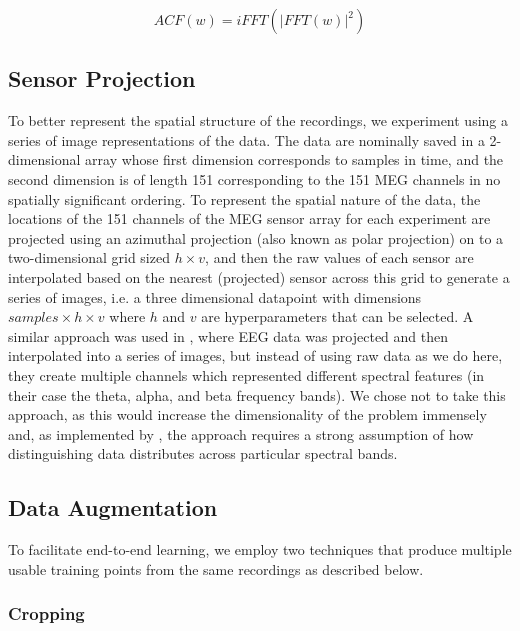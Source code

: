 \documentclass[utf8]{frontiersSCNS} %
\begin{document}

\begin{equation}
  ACF(w) = iFFT(|FFT(w)|^2)
  \label{eq1}
\end{equation}

\subsection{Sensor Projection}\label{sec:sens_proj}

To better represent the spatial structure of the recordings, we experiment using a series of image representations of the data. The data are nominally saved in a 2-dimensional array whose first dimension corresponds to samples in time, and the second dimension is of length 151 corresponding to the 151 MEG channels in no spatially significant ordering. To represent the spatial nature of the data, the locations of the 151 channels of the MEG sensor array for each experiment are projected using an azimuthal projection (also known as polar projection) on to a two-dimensional grid sized $h \times v$, and then the raw values of each sensor are  interpolated based on the nearest (projected) sensor across this grid to generate a series of images, i.e. a three dimensional datapoint with dimensions $samples \times  h \times v$ where $h$ and $v$ are hyperparameters that can be selected. A similar approach was used in \cite{Bashivan2016}, where EEG data was projected and then interpolated into a series of images, but instead of using raw data as we do here, they create multiple channels which represented different spectral features (in their case the theta, alpha, and beta frequency bands). We chose not to take this approach, as this would increase the dimensionality of the problem immensely and, as implemented by \cite{Bashivan2016}, the approach requires a strong assumption of how distinguishing data distributes across particular spectral bands.

\subsection{Data Augmentation}

To facilitate end-to-end learning, we employ two techniques that produce multiple usable training points from the same recordings as described below. 

\subsubsection{Cropping}
\end{document}
